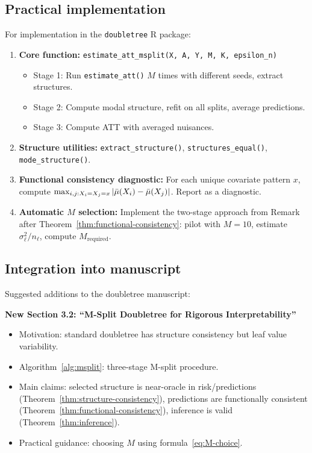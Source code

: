 \documentclass[12pt]{article}
\begin{document}
\subsection{Practical implementation}

For implementation in the \texttt{doubletree} R package:
\begin{enumerate}
\item \textbf{Core function:} \texttt{estimate\_att\_msplit(X, A, Y, M, K, epsilon\_n)}
\begin{itemize}
\item Stage 1: Run \texttt{estimate\_att()} $M$ times with different seeds, extract structures.
\item Stage 2: Compute modal structure, refit on all splits, average predictions.
\item Stage 3: Compute ATT with averaged nuisances.
\end{itemize}

\item \textbf{Structure utilities:} \texttt{extract\_structure()}, \texttt{structures\_equal()}, \texttt{mode\_structure()}.

\item \textbf{Functional consistency diagnostic:} For each unique covariate pattern $x$, compute $\max_{i,j: X_i = X_j = x} |\bar{\mu}(X_i) - \bar{\mu}(X_j)|$. Report as a diagnostic.

\item \textbf{Automatic $M$ selection:} Implement the two-stage approach from Remark after Theorem~\ref{thm:functional-consistency}: pilot with $M=10$, estimate $\sigma^2_\ell / n_\ell$, compute $M_{\text{required}}$.
\end{enumerate}

\subsection{Integration into manuscript}

Suggested additions to the doubletree manuscript:

\textbf{New Section 3.2: ``M-Split Doubletree for Rigorous Interpretability''}
\begin{itemize}
\item Motivation: standard doubletree has structure consistency but leaf value variability.
\item Algorithm~\ref{alg:msplit}: three-stage M-split procedure.
\item Main claims: selected structure is near-oracle in risk/predictions (Theorem~\ref{thm:structure-consistency}), predictions are functionally consistent (Theorem~\ref{thm:functional-consistency}), inference is valid (Theorem~\ref{thm:inference}).
\item Practical guidance: choosing $M$ using formula~\eqref{eq:M-choice}.
\end{itemize}
\end{document}

